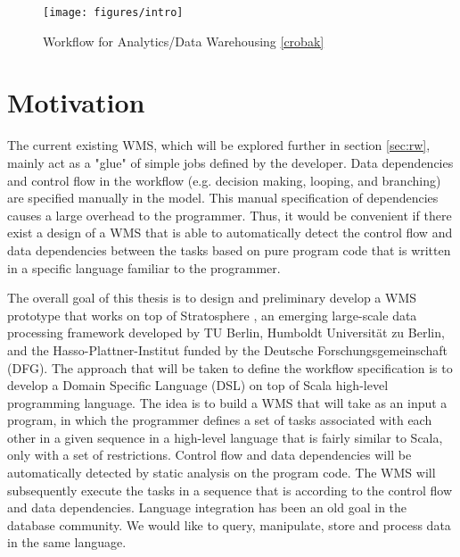 \begin{figure}[here]
\centering
\texttt{[image: figures/intro]}
\caption{Workflow for Analytics/Data Warehousing \cref{crobak}}
\label{fig:intro}
\end{figure}

\section{Motivation}
The current existing WMS, which will be explored further in section \ref{sec:rw}, mainly act as a "glue" of simple jobs defined by the developer. Data dependencies and control flow in the workflow (e.g. decision making, looping, and branching) are specified manually in the model. This manual specification of dependencies causes a large overhead to the programmer. Thus, it would be convenient if there exist a design of a WMS that is able to automatically detect the control flow and data dependencies between the tasks based on pure program code that is written in a specific language familiar to the programmer. 

The overall goal of this thesis is to design and preliminary develop a WMS prototype that works on top of Stratosphere \cite{alexandrov2014stratosphere}, an emerging large-scale data processing framework developed by TU Berlin, Humboldt Universit\"{a}t zu Berlin, and the Hasso-Plattner-Institut funded by the Deutsche Forschungsgemeinschaft (DFG). The approach that will be taken to define the workflow specification is to develop a Domain Specific Language (DSL) \cite{van2000domain} on top of Scala \cite{odersky2004overview} high-level programming language. The idea is to build a WMS that will take as an input a program, in which the programmer defines a set of tasks associated with each other in a given sequence in a high-level language that is fairly similar to Scala, only with a set of restrictions. Control flow and data dependencies will be automatically detected by static analysis on the program code. The WMS will subsequently execute the tasks in a sequence that is according to the control flow and data dependencies. Language integration has been an old goal in the database community. We would like to query, manipulate, store and process data in the same language.

